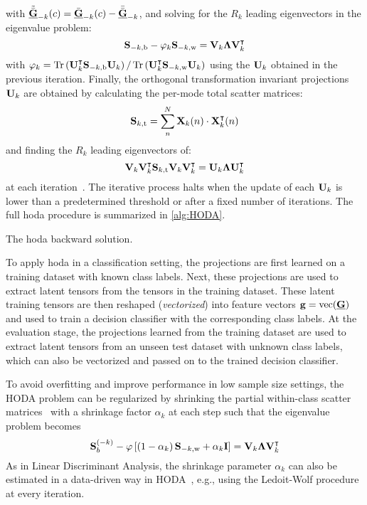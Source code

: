 \documentclass[twocolumn]{article}
\begin{document}
with $\tilde{\bar{\underline{\mathbf{G}}}}_{-k}(c) = \bar{\underline{\mathbf{G}}}_{-k}(c) - \bar{\bar{\underline{\mathbf{G}}}}_{-k}$,
and solving for the $R_k$ leading eigenvectors in the eigenvalue problem:
\begin{equation}
	\mathbf{S}_{-k,\text{b}}-\varphi_k\mathbf{S}_{-k,\text{w}} =
	\mathbf{V}_k\mathbf{\Lambda}\mathbf{V}_k^\intercal
\end{equation}
with $\varphi_k=\mathop{\mathrm{Tr}}\left(\mathbf{U}_k^\intercal\mathbf{S}_{-k,\text{b}}\mathbf{U}_k\right)/\mathop{\mathrm{Tr}}\left(\mathbf{U}_k^\intercal\mathbf{S}_{-k,\text{w}}\mathbf{U}_k\right)$
using the $\mathbf{U}_k$ obtained in the previous iteration.
Finally, the orthogonal transformation invariant projections $\mathbf{U}_k$
are obtained by calculating the
per-mode total scatter matrices:
\begin{equation}
	\mathbf{S}_{k,\text{t}} = \sum_n^N\mathbf{X}_k(n)\cdot\mathbf{X}_k^\intercal(n)
\end{equation}
and finding the $R_k$ leading eigenvectors of:
\begin{equation}
	\mathbf{V}_k\mathbf{V}_k^\intercal\mathbf{S}_{k,\text{t}}\mathbf{V}_k\mathbf{V}_k^\intercal
	= \mathbf{U}_k\mathbf{\Lambda}\mathbf{U}_k^\intercal
\end{equation}
at each iteration~\cite{Wang2007}.
The iterative process halts when the
update of each $\mathbf{U}_k$ is lower than a predetermined threshold or after a
fixed number of iterations.
The full \ac{hoda} procedure is summarized in \cref{alg:HODA}.
\begin{algorithm}
	\caption[A \acs{hoda} backward solution.]{The \acs{hoda} backward solution.}
	\label{alg:HODA}
	
\end{algorithm}

To apply \ac{hoda} in a classification setting, the projections
are first learned on a training dataset with known class labels.
Next, these projections are used to extract latent tensors from the
tensors in the training dataset.
These latent training tensors are then reshaped (\emph{vectorized}) into feature vectors
$\mathbf{g} =  \mathop{\mathrm{vec}}(\underline{\mathbf{G}})$ and used to train a decision classifier with the corresponding class labels.
At the evaluation stage, the projections learned from the training dataset are
used to extract latent tensors from an unseen test dataset with unknown class
labels, which can also be vectorized and passed on to the trained decision
classifier.

To avoid overfitting and improve performance in low sample size settings, the
HODA problem can be regularized by shrinking the partial
within-class scatter matrices~\cite{Phan2010} with a shrinkage factor
$\alpha_k$ at each step such that the eigenvalue problem becomes
\begin{equation}
	\mathbf{S}_b^{(-k)} -
	\varphi\left[\left(1-\alpha_k\right)\mathbf{S}_{-k,\text{w}}+\alpha_k\mathbf{I}\right] =
	\mathbf{V}_k\mathbf{\Lambda}\mathbf{V}_k^\intercal
\end{equation}
As in Linear Discriminant Analysis, the shrinkage parameter $\alpha_k$ can
also be estimated in a data-driven way in HODA~\cite{Jorajuria2022},
e.g., using the Ledoit-Wolf procedure~\cite{Ledoit2003} at every iteration.
\end{document}
